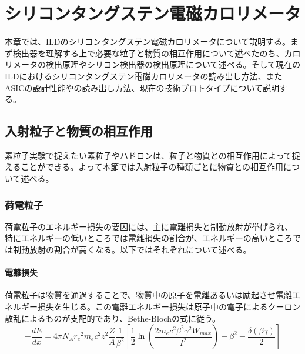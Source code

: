 
\chapter{シリコンタングステン電磁カロリメータ} \label{sec:1.Siwecal}
本章では、ILDのシリコンタングステン電磁カロリメータについて説明する。まず検出器を理解する上で必要な粒子と物質の相互作用について述べたのち、カロリメータの検出原理やシリコン検出器の検出原理について述べる。そして現在のILDにおけるシリコンタングステン電磁カロリメータの読み出し方法、またASICの設計性能やの読み出し方法、現在の技術プロトタイプについて説明する。
\section{入射粒子と物質の相互作用}
素粒子実験で捉えたい素粒子やハドロンは、粒子と物質との相互作用によって捉えることができる。よって本節では入射粒子の種類ごとに物質との相互作用について述べる。
\subsection{荷電粒子}
荷電粒子のエネルギー損失の要因には、主に電離損失と制動放射が挙げられ、特にエネルギーの低いところでは電離損失の割合が、エネルギーの高いところでは制動放射の割合が高くなる。以下ではそれぞれについて述べる。
\subsubsection{電離損失}
荷電粒子は物質を通過することで、物質中の原子を電離あるいは励起させ電離エネルギー損失を生じる。この電離エネルギー損失は原子中の電子によるクーロン散乱によるものが支配的であり、Bethe-Blochの式に従う。
\begin{equation}
-\frac{dE}{dx} = 4\pi N_A {r_e}^2 m_e c^2 z^2 \frac{Z}{A} \frac{1}{{\beta}^2} \left[ \frac{1}{2} \ln(\frac{2m_e c^2{\beta}^2{\gamma}^2W_{max}}{I^2}) -{\beta}^2 - \frac{\delta(\beta \gamma)}{2} \right]
\end{equation}

